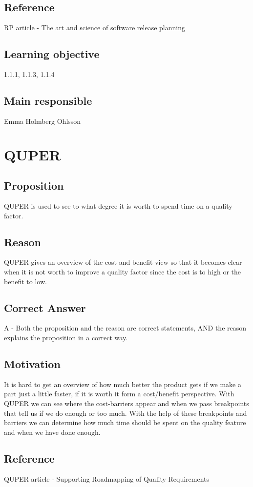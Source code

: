 \documentclass[a4paper]{article}
\begin{document}
\subsection*{Reference}
RP article - The art and science of software release planning
\subsection*{Learning objective}
1.1.1, 1.1.3, 1.1.4
\subsection*{Main responsible}
Emma Holmberg Ohlsson

\section{QUPER}
\subsection*{Proposition}
QUPER is used to see to what degree it is worth to spend time on a quality factor.
\subsection*{Reason}
QUPER gives an overview of the cost and benefit view so that it becomes clear when it is not worth to improve a quality factor since the cost is to high or the benefit to low.
\subsection*{Correct Answer}
A - Both the proposition and the reason are correct statements,
AND the reason explains the proposition in a correct way. 
\subsection*{Motivation}
It is hard to get an overview of how much better the product gets if we make a part just a little faster, if it is worth it form a cost/benefit perspective. With QUPER we can see where the cost-barriers appear and when we pass breakpoints that tell us if we do enough or too much. With the help of these breakpoints and barriers we can determine how much time should be spent on the quality feature and when we have done enough.
\subsection*{Reference}
QUPER article - Supporting Roadmapping of Quality Requirements
\end{document}
